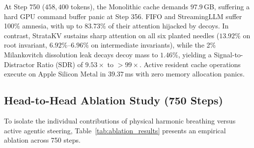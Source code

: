 \documentclass[11pt,letterpaper]{article}
\theoremstyle{definition}
\begin{document}
\begin{table}[h]
\centering
\small
{}
\caption{Multi-horizon stress test on Apple Silicon Metal under $8,192$-token tool storms and near-miss distractors.}
\label{tab:adversarial_stress}
\end{table}

At Step 750 ($458,400$ tokens), the Monolithic cache demands $97.9$\,GB, suffering a hard GPU command buffer panic at Step 356. FIFO and StreamingLLM suffer 100\% amnesia, with up to $83.73\%$ of their attention hijacked by decoys. In contrast, StrataKV sustains sharp attention on all six planted needles ($13.92\%$ on root invariant, $6.92\%$--$6.96\%$ on intermediate invariants), while the 2\% Milankovitch dissolution leak decays decoy mass to $1.46\%$, yielding a Signal-to-Distractor Ratio ($\text{SDR}$) of $9.53\times$ to $>99\times$. Active resident cache operations execute on Apple Silicon Metal in $39.37$\,ms with zero memory allocation panics.

\subsection{Head-to-Head Ablation Study (750 Steps)}
To isolate the individual contributions of physical harmonic breathing versus active agentic steering, Table~\ref{tab:ablation_results} presents an empirical ablation across 750 steps.
\end{document}
